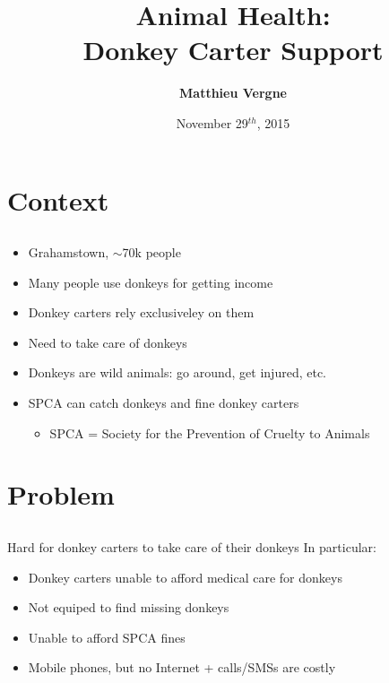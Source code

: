 \documentclass{beamer}
\title{Animal Health: \\Donkey Carter Support}
\author[Matthieu Vergne (\email{matthieu.vergne@gmail.com})]{
  \textbf{Matthieu Vergne}
  \texorpdfstring{\\ \tiny{\email{vergne@fbk.eu}}}{}
}
\date{November 29$^{th}$, 2015}
\begin{document}
\begin{frame}
\titlepage
\end{frame}

\section{Context}
\subsection{}

\begin{frame}
\begin{itemize}
 \item Grahamstown, $\sim$70k people
 \pause
 \item Many people use donkeys for getting income
 \pause
 \item Donkey carters rely exclusiveley on them
 \pause
 \item Need to take care of donkeys
 \pause
 \item Donkeys are wild animals: go around, get injured, etc.
 \pause
 \item SPCA can catch donkeys and fine donkey carters
 \begin{itemize}
  \item SPCA = Society for the Prevention of Cruelty to Animals
 \end{itemize}
\end{itemize}
\end{frame}

\section{Problem}
\subsection{}

\begin{frame}
\begin{alertblock}{Hard for donkey carters to take care of their donkeys}
\pause
In particular:
\begin{itemize}
 \item Donkey carters unable to afford medical care for donkeys
 \pause
 \item Not equiped to find missing donkeys
 \pause
 \item Unable to afford SPCA fines
 \pause
 \item Mobile phones, but no Internet + calls/SMSs are costly
\end{itemize}
\end{alertblock}
\end{frame}
\end{document}
